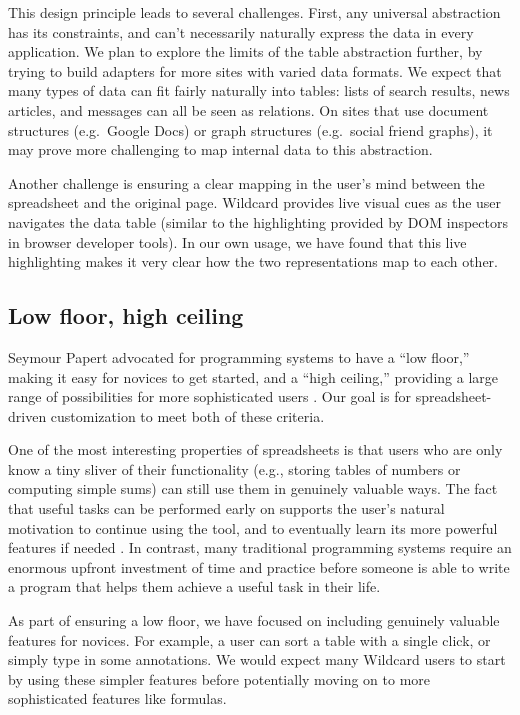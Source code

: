 \documentclass[english,submission]{programming}
\begin{document}
This design principle leads to several challenges. First, any universal
abstraction has its constraints, and can't necessarily naturally express
the data in every application. We plan to explore the limits of the
table abstraction further, by trying to build adapters for more sites
with varied data formats. We expect that many types of data can fit
fairly naturally into tables: lists of search results, news articles,
and messages can all be seen as relations. On sites that use document
structures (e.g.~Google Docs) or graph structures (e.g.~social friend
graphs), it may prove more challenging to map internal data to this
abstraction.

Another challenge is ensuring a clear mapping in the user's mind between
the spreadsheet and the original page. Wildcard provides live visual
cues as the user navigates the data table (similar to the highlighting
provided by DOM inspectors in browser developer tools). In our own
usage, we have found that this live highlighting makes it very clear how
the two representations map to each other.

\hypertarget{low-floor-high-ceiling}{%
\subsection{Low floor, high ceiling}\label{low-floor-high-ceiling}}

Seymour Papert advocated for programming systems to have a ``low
floor,'' making it easy for novices to get started, and a ``high
ceiling,'' providing a large range of possibilities for more
sophisticated users \autocite{resnick2016}. Our goal is for
spreadsheet-driven customization to meet both of these criteria.

One of the most interesting properties of spreadsheets is that users who
are only know a tiny sliver of their functionality (e.g., storing tables
of numbers or computing simple sums) can still use them in genuinely
valuable ways. The fact that useful tasks can be performed early on
supports the user's natural motivation to continue using the tool, and
to eventually learn its more powerful features if needed
\autocite{nardi1991}. In contrast, many traditional programming systems
require an enormous upfront investment of time and practice before
someone is able to write a program that helps them achieve a useful task
in their life.

As part of ensuring a low floor, we have focused on including genuinely
valuable features for novices. For example, a user can sort a table with
a single click, or simply type in some annotations. We would expect many
Wildcard users to start by using these simpler features before
potentially moving on to more sophisticated features like formulas.
\end{document}

